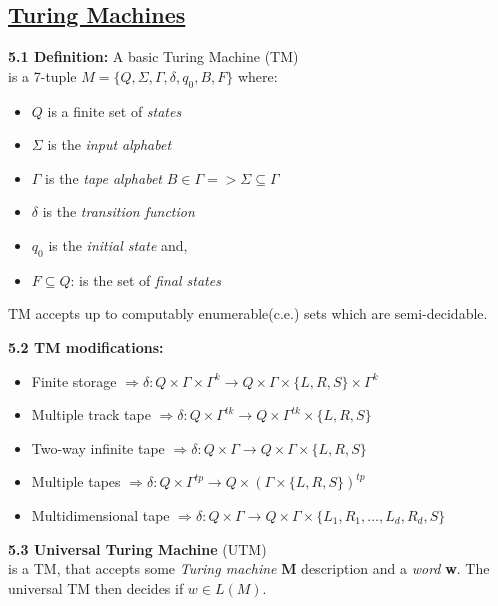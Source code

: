 \documentclass{article}
\begin{document}
\begin{multicols}{2}
\section{\underline{Turing Machines}}
\textbf{5.1 Definition:} A basic Turing Machine (TM)\\
is a 7-tuple $M = \{Q, \Sigma, \Gamma, \delta, q_0, B, F\}$ where:
\begin{itemize}
    \setlength\itemsep{-0.4em}
    \item $Q$ is a finite set of \textit{states}
    \item $\Sigma$ is the \textit{input alphabet} 
    \item $\Gamma$ is the \textit{tape alphabet} \small{$B \in \Gamma => \Sigma \subseteq \Gamma$}
    \item $\delta$ is the \textit{transition function}
    \item $q_0$ is the \textit{initial state} and,
    \item $F \subseteq Q$: is the set of \textit{final states}
\end{itemize}
TM accepts up to computably enumerable(c.e.) sets which are semi-decidable.

\textbf{5.2 TM modifications:}\\
\begin{itemize}
    \setlength\itemsep{-0.4em}
    \item Finite storage $\Rightarrow \delta: Q \times \Gamma \times \Gamma^k \rightarrow Q \times \Gamma \times \{L, R, S\} \times \Gamma^k$
    \item Multiple track tape $\Rightarrow \delta: Q \times  \Gamma^{tk} \rightarrow Q \times \Gamma^{tk} \times \{L, R, S\}$
    \item Two-way infinite tape $\Rightarrow \delta: Q \times  \Gamma \rightarrow Q \times \Gamma \times \{L, R, S\}$
    \item Multiple tapes $\Rightarrow \delta: Q \times  \Gamma^{tp} \rightarrow Q \times (\Gamma \times \{L, R, S\})^{tp}$
    \item Multidimensional tape $\Rightarrow \delta: Q \times  \Gamma \rightarrow Q \times \Gamma \times \{L_1, R_1, \dots, L_d, R_d, S\}$
\end{itemize}

\textbf{5.3 Universal Turing Machine} (UTM)\\
is a TM, that accepts some \textit{Turing machine} \textbf{M} description and a \textit{word} \textbf{w}. 
The universal TM then decides if $w \in L(M)$.\smallskip


\end{multicols}
\end{document}

